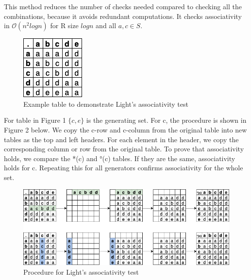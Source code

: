 \documentclass[sigconf]{acmart}
\begin{document}
This method reduces the number of checks needed compared to checking all the combinations, because it avoids redundant computations. It checks associativity in \(\mathcal{O}(n^2logn)\) for R size \(logn\) and all \(a,c \in S\).

\begin{figure}[H]
    \centering
    \includegraphics[width=0.125\linewidth]{original_table.png}
    \caption{Example table to demonstrate Light's associativity test}
\end{figure}

For table in Figure 1 \(\{c,e\}\) is the generating set. For c, the procedure is shown in Figure 2 below. We copy the c-row and c-column from the original table into new tables as the top and left headers. For each element in the header, we copy the corresponding column or row from the original table. To prove that associativity holds, we compare the *(c) and °(c) tables. If they are the same, associativity holds for c. Repeating this for all generators confirms associativity for the whole set.

\begin{figure}[H]
    \centering
    \includegraphics[width=0.5\linewidth]{Lights.png}
    \caption{Procedure for Light's associativity test}
\end{figure}
\end{document}
